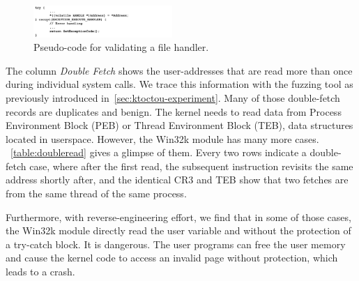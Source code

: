 \begin{figure}[th]
  \includegraphics[width=0.47\textwidth]{figures/probecode}
  \centering
  \caption{Pseudo-code for validating a file handler.}
  \label{fig:probecode}
\end{figure}



%
%
%




The column \textit{Double Fetch} shows the user-addresses that are read more than once during individual system calls. We trace this information with the fuzzing tool as previously introduced in~\autoref{sec:ktoctou-experiment}. Many of those double-fetch records are duplicates and benign. The kernel needs to read data from Process Environment Block (PEB) or Thread Environment Block (TEB), data structures located in userspace.  However, the Win32k module has many more cases. ~\autoref{table:doubleread} gives a glimpse of them. Every two rows indicate a double-fetch case, where after the first read, the subsequent instruction revisits the same address shortly after, and the identical CR3 and TEB show that two fetches are from the same thread of the same process.

Furthermore, with reverse-engineering effort, we find that in some of those cases, the Win32k module directly read the user variable and without the protection of a try-catch block. It is dangerous. The user programs can free the user memory and cause the kernel code to access an invalid page without protection, which leads to a crash.



